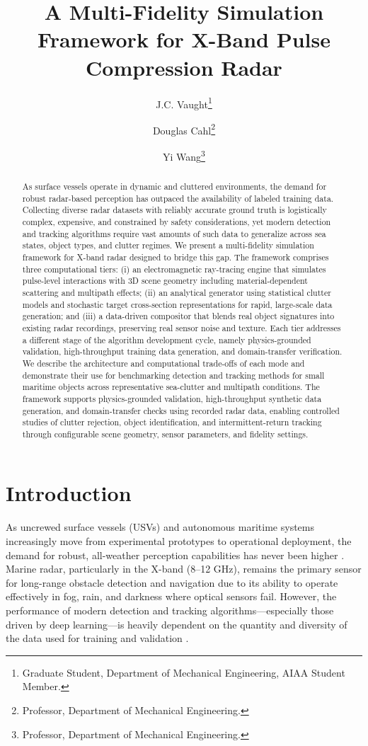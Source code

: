 \documentclass[conf]{new-aiaa}
\title{A Multi-Fidelity Simulation Framework for X-Band Pulse Compression Radar}
\author{J.C. Vaught\footnote{Graduate Student, Department of Mechanical Engineering, AIAA Student Member.}}
\author{Douglas Cahl\footnote{Professor, Department of Mechanical Engineering.}}
\author{Yi Wang\footnote{Professor, Department of Mechanical Engineering.}}
\affil{Department of Mechanical Engineering, University of South Carolina, Columbia, SC, 29208}
\begin{document}
\maketitle

\begin{abstract}
As surface vessels operate in dynamic and cluttered environments, the demand for robust radar-based perception has outpaced the availability of labeled training data. Collecting diverse radar datasets with reliably accurate ground truth is logistically complex, expensive, and constrained by safety considerations, yet modern detection and tracking algorithms require vast amounts of such data to generalize across sea states, object types, and clutter regimes. We present a multi-fidelity simulation framework for X-band radar designed to bridge this gap. The framework comprises three computational tiers: (i) an electromagnetic ray-tracing engine that simulates pulse-level interactions with 3D scene geometry including material-dependent scattering and multipath effects; (ii) an analytical generator using statistical clutter models and stochastic target cross-section representations for rapid, large-scale data generation; and (iii) a data-driven compositor that blends real object signatures into existing radar recordings, preserving real sensor noise and texture. Each tier addresses a different stage of the algorithm development cycle, namely physics-grounded validation, high-throughput training data generation, and domain-transfer verification. We describe the architecture and computational trade-offs of each mode and demonstrate their use for benchmarking detection and tracking methods for small maritime objects across representative sea-clutter and multipath conditions. The framework supports physics-grounded validation, high-throughput synthetic data generation, and domain-transfer checks using recorded radar data, enabling controlled studies of clutter rejection, object identification, and intermittent-return tracking through configurable scene geometry, sensor parameters, and fidelity settings.
\end{abstract}

\section{Introduction}
As uncrewed surface vessels (USVs) and autonomous maritime systems increasingly move from experimental prototypes to operational deployment, the demand for robust, all-weather perception capabilities has never been higher \cite{liu2016unmanned}. Marine radar, particularly in the X-band (8--12 GHz), remains the primary sensor for long-range obstacle detection and navigation due to its ability to operate effectively in fog, rain, and darkness where optical sensors fail. However, the performance of modern detection and tracking algorithms—especially those driven by deep learning—is heavily dependent on the quantity and diversity of the data used for training and validation \cite{lecun2015deep}.
\end{document}
